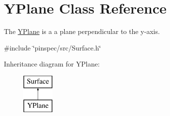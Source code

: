 \hypertarget{classYPlane}{\section{Y\-Plane Class Reference}
\label{classYPlane}
}


The \hyperlink{classYPlane}{Y\-Plane} is a a plane perpendicular to the y-\/axis.  




{\ttfamily \#include \char`\"{}pinspec/src/\-Surface.\-h\char`\"{}}

Inheritance diagram for Y\-Plane\-:\begin{figure}[H]
\begin{center}
\leavevmode
\includegraphics[height=2.000000cm]{classYPlane}
\end{center}
\end{figure}
